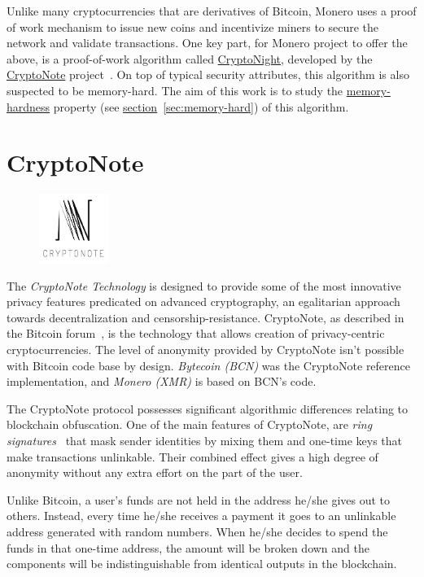 Unlike many cryptocurrencies that are derivatives of Bitcoin, Monero uses a proof of work mechanism to issue new coins and incentivize miners to secure the network and validate transactions. One key part, for Monero project to offer the above, is a proof-of-work algorithm called \hyperref[ch:cryptonight]{CryptoNight}, developed by the \hyperref[sec:CryptoNote]{CryptoNote} project~\cite{citeulike:14139412}. On top of typical security attributes, this algorithm is also suspected to be memory-hard. The aim of this work is to study the \hyperref[sec:memory-hard]{memory-hardness} property (see \hyperref[sec:memory-hard]{section}~\ref{sec:memory-hard}) of this algorithm.
\clearpage
\pagebreak

\section{CryptoNote} \label{sec:CryptoNote}
\begin{figure}
\centering
\includegraphics[width=0.20\textwidth]{Images/CryptoNote/cryptonote.png}
\end{figure}
The \emph{CryptoNote Technology} is designed to provide some of the most innovative privacy features predicated on advanced cryptography, an egalitarian approach towards decentralization and censorship-resistance. CryptoNote, as described in the Bitcoin forum~\cite{btcforum}, is the technology that allows creation of privacy-centric cryptocurrencies. The level of anonymity provided by CryptoNote isn't possible with Bitcoin code base by design. \emph{Bytecoin (BCN)} was the CryptoNote reference implementation, and \emph{Monero (XMR)} is based on BCN's code.

The CryptoNote protocol possesses significant algorithmic differences relating to blockchain obfuscation. One of the main features of CryptoNote, are \emph{ring signatures}~\cite{citeulike:14139412} that mask sender identities by mixing them and one-time keys that make transactions unlinkable. Their combined effect gives a high degree of anonymity without any extra effort on the part of the user.

Unlike Bitcoin, a user's funds are not held in the address he/she gives out to others. Instead, every time he/she receives a payment it goes to an unlinkable address generated with random numbers. When he/she decides to spend the funds in that one-time address, the amount will be broken down and the components will be indistinguishable from identical outputs in the blockchain.

